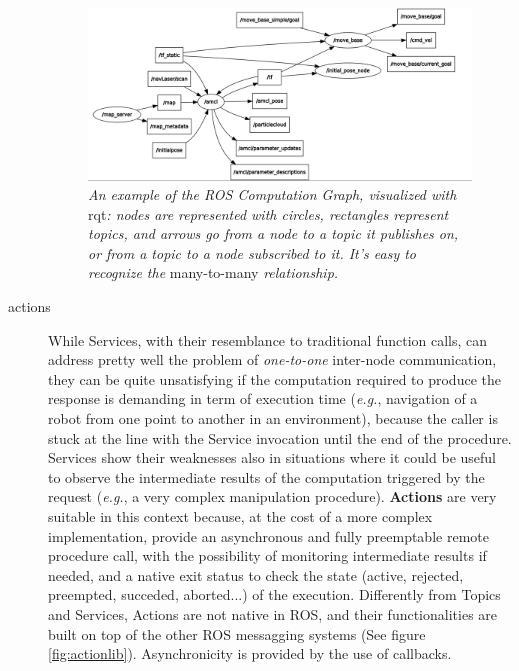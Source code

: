 \begin{description}
\begin{figure}
	\centering
	\includegraphics[width=1.1\textwidth]{Images/background_and_tools/rqt_graph.png}
	\caption{\textit{An example of the \ac{ROS} Computation Graph, visualized with} rqt\textit{: nodes are represented with circles, rectangles represent topics, and arrows go from a node to a topic it publishes on, or from a topic to a node subscribed to it. It's easy to recognize the} many-to-many \textit{relationship.}}
	\label{fig:tfComputationGraph}
\end{figure}

\item[actions] While Services, with their resemblance to traditional function calls, can address pretty well the problem of \textit{one-to-one} inter-node communication, they can be quite unsatisfying if the computation required to produce the response is demanding in term of execution time (\textit{e.g.}, navigation of a robot from one point to another in an environment), because the caller is stuck at the line with the Service invocation until the end of the procedure. Services show their weaknesses also in situations where it could be useful to observe the intermediate results of the computation triggered by the request (\textit{e.g.}, a very complex manipulation procedure). \textbf{Actions} are very suitable in this context because, at the cost of a more complex implementation, provide an asynchronous and fully preemptable remote procedure call, with the possibility of monitoring intermediate results if needed, and a native exit status to check the state (active, rejected, preempted, succeded, aborted...) of the execution. Differently from Topics and Services, Actions are not native in \ac{ROS}, and their functionalities are built on top of the other \ac{ROS} messagging systems (See figure \ref{fig:actionlib}). Asynchronicity is provided by the use of callbacks.
\end{description}

